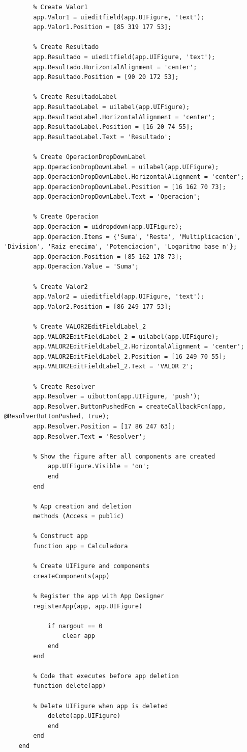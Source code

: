 \documentclass{article}
\begin{document}
\begin{lstlisting}
		% Create Valor1
		app.Valor1 = uieditfield(app.UIFigure, 'text');
		app.Valor1.Position = [85 319 177 53];
	
		% Create Resultado
		app.Resultado = uieditfield(app.UIFigure, 'text');
		app.Resultado.HorizontalAlignment = 'center';
		app.Resultado.Position = [90 20 172 53];
	
		% Create ResultadoLabel
		app.ResultadoLabel = uilabel(app.UIFigure);
		app.ResultadoLabel.HorizontalAlignment = 'center';
		app.ResultadoLabel.Position = [16 20 74 55];
		app.ResultadoLabel.Text = 'Resultado';
	
		% Create OperacionDropDownLabel
		app.OperacionDropDownLabel = uilabel(app.UIFigure);
		app.OperacionDropDownLabel.HorizontalAlignment = 'center';
		app.OperacionDropDownLabel.Position = [16 162 70 73];
		app.OperacionDropDownLabel.Text = 'Operacion';
		
		% Create Operacion
		app.Operacion = uidropdown(app.UIFigure);
		app.Operacion.Items = {'Suma', 'Resta', 'Multiplicacion', 	'Division', 'Raiz enecima', 'Potenciacion', 'Logaritmo base n'};
		app.Operacion.Position = [85 162 178 73];
		app.Operacion.Value = 'Suma';
	
		% Create Valor2
		app.Valor2 = uieditfield(app.UIFigure, 'text');
		app.Valor2.Position = [86 249 177 53];
		
		% Create VALOR2EditFieldLabel_2
		app.VALOR2EditFieldLabel_2 = uilabel(app.UIFigure);
		app.VALOR2EditFieldLabel_2.HorizontalAlignment = 'center';
		app.VALOR2EditFieldLabel_2.Position = [16 249 70 55];
		app.VALOR2EditFieldLabel_2.Text = 'VALOR 2';
		
		% Create Resolver
		app.Resolver = uibutton(app.UIFigure, 'push');
		app.Resolver.ButtonPushedFcn = createCallbackFcn(app, @ResolverButtonPushed, true);
		app.Resolver.Position = [17 86 247 63];
		app.Resolver.Text = 'Resolver';
		
		% Show the figure after all components are created
			app.UIFigure.Visible = 'on';
			end
		end
		
		% App creation and deletion
		methods (Access = public)
		
		% Construct app
		function app = Calculadora
		
		% Create UIFigure and components
		createComponents(app)
		
		% Register the app with App Designer
		registerApp(app, app.UIFigure)
		
			if nargout == 0
				clear app
			end
		end
		
		% Code that executes before app deletion
		function delete(app)
		
		% Delete UIFigure when app is deleted
			delete(app.UIFigure)
			end
		end
	end
	\end{lstlisting}
	
\end{document}
